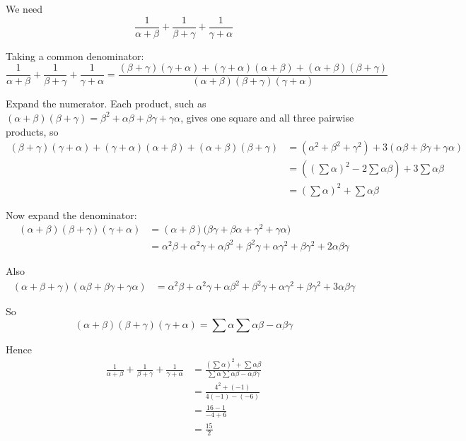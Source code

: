 \documentclass[leqno]{article}
\begin{document}
\begin{enumerate}[
  label=\textbf{\arabic*.},
  leftmargin=*,
  topsep=0pt,
  partopsep=0pt,
  parsep=0pt
]
\begin{djsSolution}
We need
\[
\frac{1}{\alpha+\beta}+\frac{1}{\beta+\gamma}+\frac{1}{\gamma+\alpha}
\]

Taking a common denominator:
\[
\frac{1}{\alpha+\beta}+\frac{1}{\beta+\gamma}+\frac{1}{\gamma+\alpha}
=\frac{(\beta+\gamma)(\gamma+\alpha)+(\gamma+\alpha)(\alpha+\beta)+(\alpha+\beta)(\beta+\gamma)}
{(\alpha+\beta)(\beta+\gamma)(\gamma+\alpha)}
\]

Expand the numerator. Each product, such as \((\alpha+\beta)(\beta+\gamma)=\beta^2+\alpha\beta+\beta\gamma+\gamma\alpha\), gives one square and all three pairwise products, so
\begin{align*}
(\beta+\gamma)(\gamma+\alpha)+(\gamma+\alpha)(\alpha+\beta)+(\alpha+\beta)(\beta+\gamma)
&=(\alpha^2+\beta^2+\gamma^2)+3(\alpha\beta+\beta\gamma+\gamma\alpha)\\
&=\left(\left(\sum\alpha\right)^2-2\sum\alpha\beta\right)+3\sum\alpha\beta\\
&=\left(\sum\alpha\right)^2+\sum\alpha\beta
\end{align*}

Now expand the denominator:
\begin{align*}
(\alpha+\beta)(\beta+\gamma)(\gamma+\alpha)
&=(\alpha+\beta)\bigl(\beta\gamma+\beta\alpha+\gamma^2+\gamma\alpha\bigr)\\
&=\alpha^2\beta+\alpha^2\gamma+\alpha\beta^2+\beta^2\gamma+\alpha\gamma^2+\beta\gamma^2+2\alpha\beta\gamma
\end{align*}

Also
\begin{align*}
(\alpha+\beta+\gamma)(\alpha\beta+\beta\gamma+\gamma\alpha)
&=\alpha^2\beta+\alpha^2\gamma+\alpha\beta^2+\beta^2\gamma+\alpha\gamma^2+\beta\gamma^2+3\alpha\beta\gamma
\end{align*}

So
\[
(\alpha+\beta)(\beta+\gamma)(\gamma+\alpha)=\sum\alpha\sum\alpha\beta-\alpha\beta\gamma
\]

Hence
\begin{align*}
\frac{1}{\alpha+\beta}+\frac{1}{\beta+\gamma}+\frac{1}{\gamma+\alpha}
&=\frac{\left(\sum\alpha\right)^2+\sum\alpha\beta}{\sum\alpha\sum\alpha\beta-\alpha\beta\gamma}\\
&=\frac{4^2+(-1)}{4(-1)-(-6)}\\
&=\frac{16-1}{-4+6}\\
&=\frac{15}{2}
\end{align*}
\end{djsSolution}


\newpage


\end{enumerate}
\end{document}
